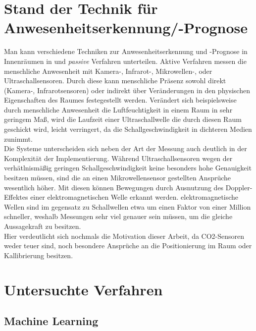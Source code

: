 \clearpage
\chapter{\textbf{Stand der Technik für Anwesenheitserkennung/-Prognose}}\label{grundlagen}

Man kann verschiedene Techniken zur Anwesenheitserkennung und -Prognose in Innenräumen in  und
\textit{passive} Verfahren unterteilen. Aktive Verfahren messen die menschliche Anwesenheit mit Kamera-, 
Infrarot-, Mikrowellen-, oder Ultraschallsensoren. Durch diese kann menschliche Präsenz sowohl direkt 
(Kamera-, Infrarotsensoren) oder indirekt über Veränderungen in den physischen Eigenschaften des Raumes 
festegestellt werden. Verändert sich beispielsweise durch menschliche Anwesenheit die Luftfeuchtigkeit 
in einem Raum in sehr geringem Maß, wird die  Laufzeit einer Ultraschallwelle die durch diesen Raum 
geschickt wird, leicht verringert, da die Schallgeschwindigkeit in dichteren Medien zunimmt.\\
Die Systeme unterscheiden sich neben der Art der Messung auch deutlich in der Komplexität der Implementierung.
Während Ultraschallsensoren wegen der verhätlnismäßig geringen Schallgeschwindigkeit keine besonders hohe 
Genauigkeit besitzen müssen, sind die an einen Mikrowellensensor gestellten Ansprüche wesentlich höher. Mit 
diesen können Bewegungen durch Ausnutzung des Doppler-Effektes einer elektromagnetischen Welle erkannt werden. 
elektromagnetische Wellen sind im gegensatz zu Schallwellen etwa um einen Faktor von einer Million schneller, 
weshalb Messungen sehr viel genauer sein müssen, um die gleiche Aussagekraft zu besitzen.\\
Hier verdeutlicht sich nochmals die Motivation dieser Arbeit, da CO2-Sensoren weder teuer sind, noch 
besondere Ansprüche an die Positionierung im Raum oder Kallibrierung besitzen.

\chapter{\textbf{Untersuchte Verfahren}}

\section{Machine Learning}\label{unterkapitel}

